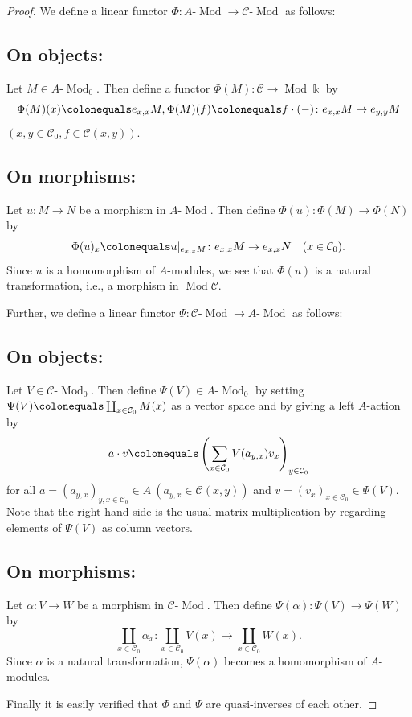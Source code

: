 \documentclass{surv-l}
\numberwithin{equation}{chapter}
\numberwithin{figure}{chapter}
\theoremstyle{plain}
\theoremstyle{definition}
\theoremstyle{remark}
\newcommand{\lMod}{\text{-}\!\Mod}
\DeclareMathOperator{\Mod}{Mod}
\DeclareMathOperator{\blank}{-}
\begin{document}
\begin{proof}
We define a linear functor $\Phi \colon A\lMod \to {\mathcal{C}}\lMod$ as
follows:

\subsection*{On objects:}
Let $M \in A\lMod _0$.
Then define a functor $\Phi(M) \colon {\mathcal{C}} \to \Mod\Bbbk$ by
\[
\Phi(M)(x)\colonequals  e_{x,x}M, \Phi(M)(f)\colonequals  f\cdot(\blank) \colon e_{x,x}M \to e_{y,y}M
\]
$(x, y \in {\mathcal{C}}_0, f \in {\mathcal{C}}(x, y))$.

\subsection*{On morphisms:}
Let $u \colon M \to N$ be a morphism in $A\lMod$.
Then define $\Phi(u) \colon \Phi(M) \to \Phi(N)$ by
\[
\Phi(u)_x\colonequals  u|_{e_{x,x}M} \colon e_{x,x}M \to e_{x,x}N \quad (x \in {\mathcal{C}}_0).
\]
Since $u$ is a homomorphism of $A$-modules, we see that
$\Phi(u)$ is a natural transformation, i.e., a morphism in $\Mod{\mathcal{C}}$.

Further, we define a linear functor $\Psi \colon {\mathcal{C}}\lMod \to A\lMod$ as follows:

\subsection*{On objects:}
Let $V \in {\mathcal{C}}\lMod_0$.
Then define $\Psi(V) \in A\lMod_0$ by setting $\Psi(V)\colonequals  \coprod_{x \in {\mathcal{C}}_0}M(x)$
as a vector space and by giving a left $A$-action by
\[
a\cdot v\colonequals  \left(\sum_{x \in {\mathcal{C}}_0} V(a_{y,x}) v_x \right)_{y \in {\mathcal{C}}_0}
\]
for all $a = (a_{y,x})_{y,x \in {\mathcal{C}}_0} \in A \ (a_{y,x} \in {\mathcal{C}}(x,y))$ and
$v = (v_x)_{x \in {\mathcal{C}}_0} \in \Psi(V)$.
Note that the right-hand side
is the usual matrix multiplication by regarding elements of $\Psi(V)$
as column vectors.

\subsection*{On morphisms:}
Let $\alpha \colon V \to W$ be a morphism in ${\mathcal{C}}\lMod$.
Then define $\Psi(\alpha) \colon \Psi(V) \to  \Psi(W)$ by
\[
\coprod_{x \in {\mathcal{C}}_0} \alpha_x \colon \coprod_{x\in {\mathcal{C}}_0}V(x) \to \coprod_{x \in {\mathcal{C}}_0}W(x).
\]
Since $\alpha$ is a natural transformation,
$\Psi(\alpha)$ becomes a homomorphism of $A$-modules.

Finally it is easily verified that
$\Phi$ and $\Psi$ are quasi-inverses of each other.
\end{proof}
\end{document}
